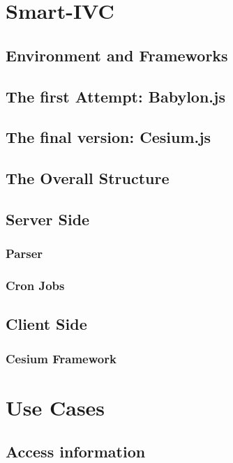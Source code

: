 \documentclass[]{usiinfbachelorproject}
\newcommand{\applicationName}{Smart-IVC}
\begin{document}
\section{\applicationName} \label{projectDesign}
\subsection{Environment and Frameworks}
\subsection{The first Attempt: Babylon.js}
\subsection{The final version: Cesium.js}
\subsection{The Overall Structure}
\subsection{Server Side}
\subsubsection{Parser}
\subsubsection{Cron Jobs}
\subsection{Client Side}
\subsubsection{Cesium Framework}


\section{Use Cases} \label{tests}
\subsection{Access information}
\end{document}
